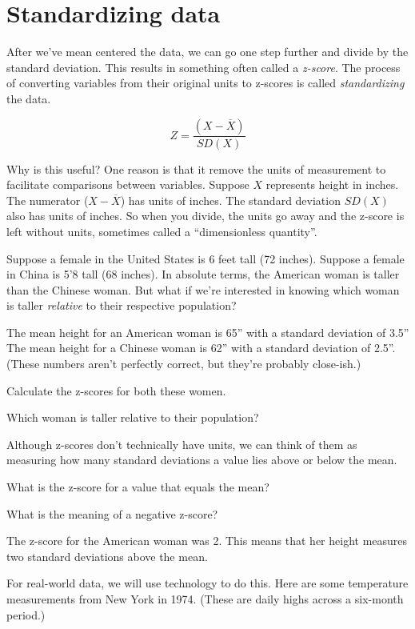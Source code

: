 \documentclass[
]{book}
\begin{document}
\hypertarget{variance-standardizing}{%
\section{Standardizing data}\label{variance-standardizing}}

After we've mean centered the data, we can go one step further and divide by the standard deviation. This results in something often called a \emph{z-score}. The process of converting variables from their original units to z-scores is called \emph{standardizing} the data.

\[
Z = \frac{\left(X - \overline{X}\right)}{SD(X)}
\]

Why is this useful? One reason is that it remove the units of measurement to facilitate comparisons between variables. Suppose \(X\) represents height in inches. The numerator (\(X - \overline{X}\)) has units of inches. The standard deviation \(SD(X)\) also has units of inches. So when you divide, the units go away and the z-score is left without units, sometimes called a ``dimensionless quantity''.

Suppose a female in the United States is 6 feet tall (72 inches). Suppose a female in China is 5'8 tall (68 inches). In absolute terms, the American woman is taller than the Chinese woman. But what if we're interested in knowing which woman is taller \emph{relative} to their respective population?

The mean height for an American woman is 65'' with a standard deviation of 3.5'' The mean height for a Chinese woman is 62'' with a standard deviation of 2.5''. (These numbers aren't perfectly correct, but they're probably close-ish.)

Calculate the z-scores for both these women.

Which woman is taller relative to their population?

Although z-scores don't technically have units, we can think of them as measuring how many standard deviations a value lies above or below the mean.

What is the z-score for a value that equals the mean?

What is the meaning of a negative z-score?

The z-score for the American woman was 2. This means that her height measures two standard deviations above the mean.

For real-world data, we will use technology to do this. Here are some temperature measurements from New York in 1974. (These are daily highs across a six-month period.)
\end{document}
